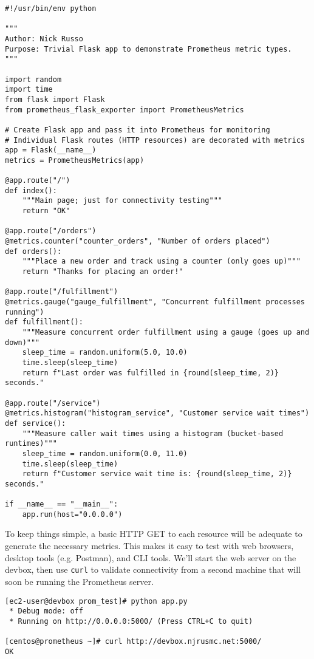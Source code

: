 \begin{verbatim}
#!/usr/bin/env python

"""
Author: Nick Russo
Purpose: Trivial Flask app to demonstrate Prometheus metric types.
"""

import random
import time
from flask import Flask
from prometheus_flask_exporter import PrometheusMetrics

# Create Flask app and pass it into Prometheus for monitoring
# Individual Flask routes (HTTP resources) are decorated with metrics
app = Flask(__name__)
metrics = PrometheusMetrics(app)

@app.route("/")
def index():
    """Main page; just for connectivity testing"""
    return "OK"

@app.route("/orders")
@metrics.counter("counter_orders", "Number of orders placed")
def orders():
    """Place a new order and track using a counter (only goes up)"""
    return "Thanks for placing an order!"

@app.route("/fulfillment")
@metrics.gauge("gauge_fulfillment", "Concurrent fulfillment processes running")
def fulfillment():
    """Measure concurrent order fulfillment using a gauge (goes up and down)"""
    sleep_time = random.uniform(5.0, 10.0)
    time.sleep(sleep_time)
    return f"Last order was fulfilled in {round(sleep_time, 2)} seconds."

@app.route("/service")
@metrics.histogram("histogram_service", "Customer service wait times")
def service():
    """Measure caller wait times using a histogram (bucket-based runtimes)"""
    sleep_time = random.uniform(0.0, 11.0)
    time.sleep(sleep_time)
    return f"Customer service wait time is: {round(sleep_time, 2)} seconds."

if __name__ == "__main__":
    app.run(host="0.0.0.0")
\end{verbatim}

To keep things simple, a basic HTTP GET to each resource will be adequate
to generate the necessary metrics. This makes it easy to test with web
browsers, desktop tools (e.g. Postman), and CLI tools. We'll start the
web server on the devbox, then use \verb|curl| to validate connectivity
from a second machine that will soon be running the Prometheus server.

\begin{verbatim}
[ec2-user@devbox prom_test]# python app.py
 * Debug mode: off
 * Running on http://0.0.0.0:5000/ (Press CTRL+C to quit)

[centos@prometheus ~]# curl http://devbox.njrusmc.net:5000/
OK
\end{verbatim}

